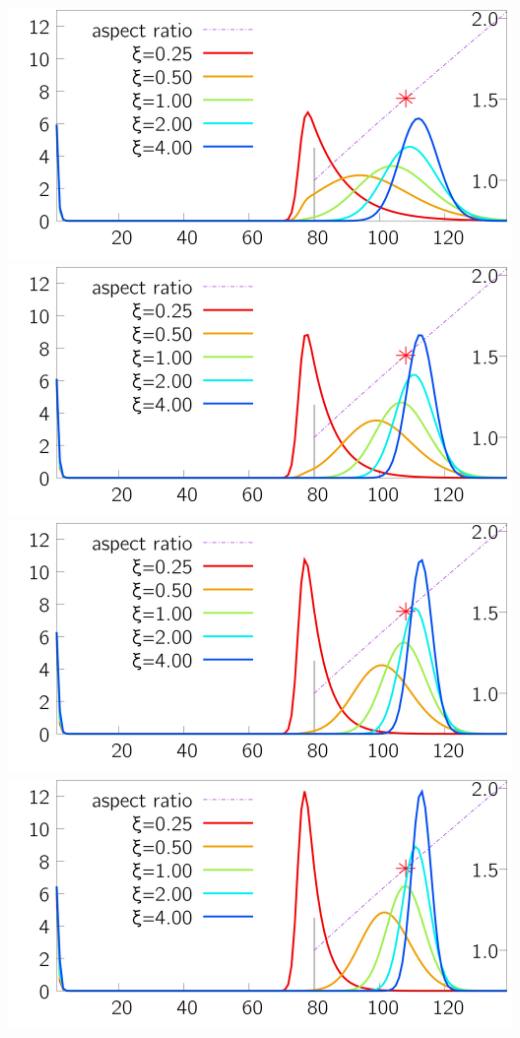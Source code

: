 \begin{minipage}{0.25\textwidth} 
 \includegraphics[width=\textwidth ]{../plots_size-distribution_png/plot_size-distribution_eagg1-ki1__xi.png}
\includegraphics[width=\textwidth ]{../plots_size-distribution_png/plot_size-distribution_eagg1-ki2__xi.png}
\includegraphics[width=\textwidth ]{../plots_size-distribution_png/plot_size-distribution_eagg1-ki3__xi.png}
\includegraphics[width=\textwidth ]{../plots_size-distribution_png/plot_size-distribution_eagg1-ki4__xi.png}
\end{minipage}%
